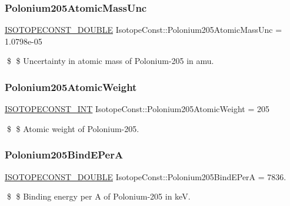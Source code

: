 \subsubsection{\texorpdfstring{Polonium205\+Atomic\+Mass\+Unc}{Polonium205AtomicMassUnc}}
{\footnotesize\ttfamily \mbox{\hyperlink{group___isotope_const-_macros_ga8f45a7272ce02c0b4c65c44636ed719a}{I\+S\+O\+T\+O\+P\+E\+C\+O\+N\+S\+T\+\_\+\+D\+O\+U\+B\+LE}} Isotope\+Const\+::\+Polonium205\+Atomic\+Mass\+Unc = 1.\+0798e-\/05}

\$ \$ Uncertainty in atomic mass of Polonium-\/205 in amu. \mbox{\label{group___isotope_const-_polonium-_po205_gad2fb6b27b0e64f742c9cf2aaf1717653}} 
\subsubsection{\texorpdfstring{Polonium205\+Atomic\+Weight}{Polonium205AtomicWeight}}
{\footnotesize\ttfamily \mbox{\hyperlink{group___isotope_const-_macros_ga5f18360b3e99483a35c32d789e62621c}{I\+S\+O\+T\+O\+P\+E\+C\+O\+N\+S\+T\+\_\+\+I\+NT}} Isotope\+Const\+::\+Polonium205\+Atomic\+Weight = 205}

\$ \$ Atomic weight of Polonium-\/205. \mbox{\label{group___isotope_const-_polonium-_po205_ga0c73b4948d17af4c68834f2197955d7b}} 
\subsubsection{\texorpdfstring{Polonium205\+Bind\+E\+PerA}{Polonium205BindEPerA}}
{\footnotesize\ttfamily \mbox{\hyperlink{group___isotope_const-_macros_ga8f45a7272ce02c0b4c65c44636ed719a}{I\+S\+O\+T\+O\+P\+E\+C\+O\+N\+S\+T\+\_\+\+D\+O\+U\+B\+LE}} Isotope\+Const\+::\+Polonium205\+Bind\+E\+PerA = 7836.}

\$ \$ Binding energy per A of Polonium-\/205 in keV. \mbox{\label{group___isotope_const-_polonium-_po205_gabf9976728df3fedd0647087837bb7d9b}} 
